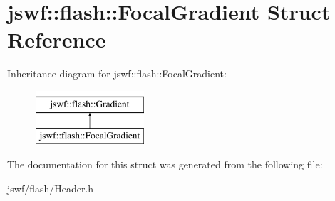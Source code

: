 \hypertarget{structjswf_1_1flash_1_1_focal_gradient}{\section{jswf\+:\+:flash\+:\+:Focal\+Gradient Struct Reference}
\label{structjswf_1_1flash_1_1_focal_gradient}
}
Inheritance diagram for jswf\+:\+:flash\+:\+:Focal\+Gradient\+:\begin{figure}[H]
\begin{center}
\leavevmode
\includegraphics[height=2.000000cm]{structjswf_1_1flash_1_1_focal_gradient}
\end{center}
\end{figure}


The documentation for this struct was generated from the following file\+:\begin{DoxyCompactItemize}
\item 
jswf/flash/Header.\+h\end{DoxyCompactItemize}
